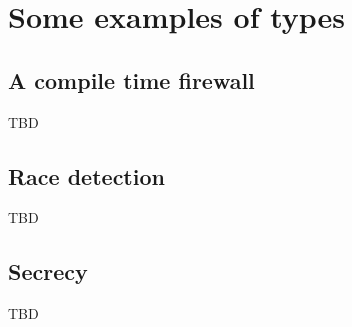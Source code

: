 \section{Some examples of types}
\subsection{A compile time firewall}
TBD

\subsection{Race detection}
TBD

\subsection{Secrecy}
TBD
